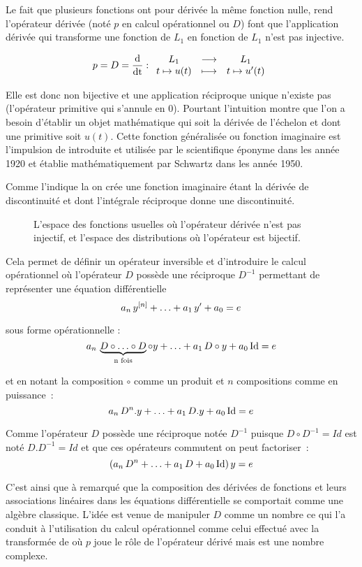 Le fait que plusieurs fonctions ont pour dérivée la même fonction
nulle, rend l'opérateur dérivée (noté $p$ en calcul opérationnel ou
$D$) font que l'application dérivée qui transforme une fonction de
$L_1$ en fonction de $L_1$ n'est pas injective.

\begin{equation}
  \label{eq:application_derivee}
  p=D=\frac{\mathrm{d{}}}{\mathrm{d{t}}} : \begin{array}{ccc} L_1 & \longrightarrow & L_1 \\ t\mapsto u(t) & \longmapsto & t\mapsto u'(t) \\ \end{array}
\end{equation}


Elle est donc non bijective et une application réciproque unique
n'existe pas (l'opérateur primitive qui s'annule en 0). Pourtant
l'intuition montre que l'on a besoin d'établir un objet mathématique
qui soit la dérivée de l'échelon et dont une primitive soit
$u(t)$. Cette fonction généralisée ou fonction imaginaire est
l'impulsion de \Dirac{} introduite et utilisée par le scientifique
éponyme dans les année 1920 et établie mathématiquement par Schwartz
dans les année 1950.

Comme l'indique la  on crée une
fonction imaginaire étant la dérivée de discontinuité et dont
l'intégrale réciproque donne une discontinuité.
\begin{figure}[ht!]
  \centering
  \caption{L'espace des fonctions usuelles où l'opérateur dérivée n'est pas injectif, et l'espace des distributions où l'opérateur est bijectif. }
  \label{fig:fonctions_et_distributions}
\end{figure}


Cela permet de définir un opérateur inversible et d'introduire le
calcul opérationnel où l'opérateur $D$ possède une réciproque $D^{-1}$
permettant de représenter une équation différentielle
$$
 a_n\,y^{\left[n\right]}+\ldots+a_1\,y'+a_0 = e
$$

sous forme opérationnelle :
$$
 a_n\,\underbrace{D\circ\ldots\circ D}_{\text{n fois}}\circ y + \ldots +a_1\, D\circ y + a_0\, \mathrm{Id} = e
$$

et en notant la composition $\circ$ comme un produit et $n$
compositions comme en puissance~:
$$
 a_n\,D^n.y + \ldots +a_1\, D . y + a_0 \,\mathrm{Id} = e
$$

Comme l'opérateur $D$ possède une réciproque notée $D^{-1}$ puisque $D\circ D^{-1}= Id$ est noté $D.D^{-1}=Id$ et que ces opérateurs commutent on peut factoriser~:
$$
 \left(a_n\,D^n + \ldots +a_1\, D  + a_0 \,\mathrm{Id}\right) y = e
$$

C'est ainsi que \Heaviside{} à remarqué que la composition des
dérivées de fonctions et leurs associations linéaires dans les
équations différentielle se comportait comme une algèbre
classique. L'idée est venue de manipuler $D$ comme un nombre ce qui
l'a conduit à l'utilisation du calcul opérationnel comme celui
effectué avec la transformée de \Laplace{} où $p$ joue le rôle de
l'opérateur dérivé mais est une nombre complexe.

